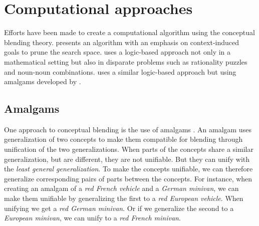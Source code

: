 \section{Computational approaches}
Efforts have been made to create a computational algorithm using the conceptual blending theory.
\citet{li2012goal} presents an algorithm with an emphasis on context-induced goals to prune the search space. %
\citet{martinez2011towards} uses a logic-based approach not only in a mathematical setting but also in disparate problems such as rationality puzzles and noun-noun combinations.
\citet{besold2015generalize} uses a similar logic-based approach but using amalgams developed by \citet{ontanon2010amalgams}.










\subsection{Amalgams}
One approach to conceptual blending is the use of amalgams \parencite{ontanon2010amalgams}.
An amalgam uses generalization of two concepts to make them compatible for blending through unification of the two generalizations. When parts of the concepts share a similar generalization, but are different, they are not unifiable. But they can unify with the \emph{least general generalization}. To make the concepts unifiable, we can therefore generalize corresponding pairs of parts between the concepts. For instance, when creating an amalgam of a \emph{red French vehicle} and a \emph{German minivan}, we can make them unifiable by generalizing the first to a \emph{red European vehicle}. When unifying we get a \emph{red German minivan}. Or if we generalize the second to a \emph{European minivan}, we can unify to a \emph{red French minivan}.

